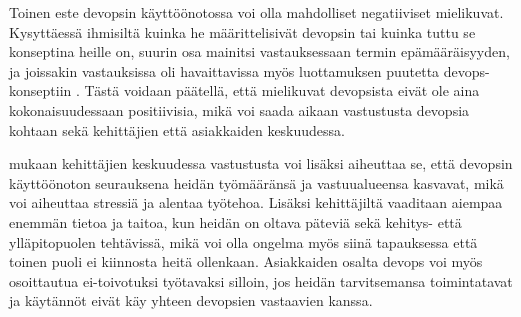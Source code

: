 \documentclass[finnish]{tktltiki2}
\theoremstyle{definition}
\theoremstyle{remark}
\begin{document}
Toinen este devopsin käyttöönotossa voi olla mahdolliset negatiiviset mielikuvat. Kysyttäessä ihmisiltä kuinka he määrittelisivät devopsin tai kuinka tuttu se konseptina heille on, suurin osa mainitsi vastauksessaan termin epämääräisyyden, ja joissakin vastauksissa oli havaittavissa myös luottamuksen puutetta devops-konseptiin \parencite{smeds15}. Tästä voidaan päätellä, että mielikuvat devopsista eivät ole aina kokonaisuudessaan positiivisia, mikä voi saada aikaan vastustusta devopsia kohtaan sekä kehittäjien että asiakkaiden keskuudessa. 

\textcite{smeds15} mukaan kehittäjien keskuudessa vastustusta voi lisäksi aiheuttaa se, että devopsin käyttöönoton seurauksena heidän työmääränsä ja vastuualueensa kasvavat, mikä voi aiheuttaa stressiä ja alentaa työtehoa. Lisäksi kehittäjiltä vaaditaan aiempaa enemmän tietoa ja taitoa, kun heidän on oltava päteviä sekä kehitys- että ylläpitopuolen tehtävissä, mikä voi olla ongelma myös siinä tapauksessa että toinen puoli ei kiinnosta heitä ollenkaan. Asiakkaiden osalta devops voi myös osoittautua ei-toivotuksi työtavaksi silloin, jos heidän tarvitsemansa toimintatavat ja käytännöt eivät käy yhteen devopsien vastaavien kanssa.

%
%
% 
%

%
%
\printbibliography



% 
\end{document}
